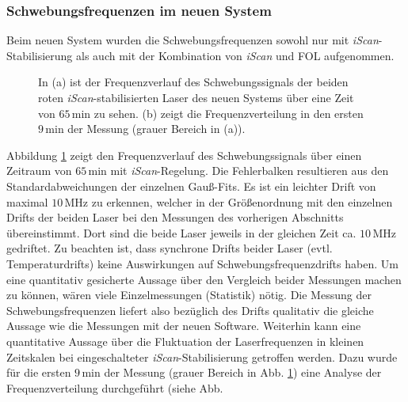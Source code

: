 \subsubsection{Schwebungsfrequenzen im neuen
System}\label{subsubsec:beatfrequenzmessung_neues_system}
Beim neuen System wurden die Schwebungsfrequenzen sowohl nur mit
\textit{iScan}-Stabilisierung als auch mit der Kombination von \textit{iScan}
und FOL aufgenommen.
\begin{figure}[hp]
 	\centering
 	\footnotesize
 	\fbox{\parbox{\dimexpr \linewidth - 2\fboxrule - 2\fboxsep}{
 	\subfloat[]{
		\label{subfig:beatfrequenzen_neu_iScan_drift}
		
		}\\
 	\subfloat[]{
		\label{subfig:beatfrequenzen_neu_iScan_histogramm}
		
		}
	}}
	\caption[Beatfrequenzen - neues System mit \textit{iScan}]{In (a) ist der
	Frequenzverlauf des Schwebungssignals der beiden roten
	\textit{iScan}-stabilisierten Laser des neuen Systems über eine Zeit von
	$65\,$min zu sehen.
	(b) zeigt die Frequenzverteilung in den ersten $9\,$min der Messung (grauer Bereich in (a)).}
	\label{fig:beatfrequenzen_neu_iScan}
\end{figure}
Abbildung
\ref{fig:beatfrequenzen_neu_iScan} zeigt den Frequenzverlauf des Schwebungssignals über einen Zeitraum von $65\,$min mit
\textit{iScan}-Regelung. Die Fehlerbalken resultieren aus den
Standardabweichungen der einzelnen Gauß-Fits. Es ist ein leichter Drift von
maximal $10\,$MHz zu erkennen, welcher in der Größenordnung mit den
einzelnen Drifts der beiden Laser bei den Messungen des vorherigen Abschnitts
übereinstimmt. Dort sind die beide Laser jeweils in der gleichen Zeit ca.
$10\,$MHz gedriftet. Zu beachten ist, dass synchrone Drifts beider Laser (evtl.
Temperaturdrifts) keine Auswirkungen auf Schwebungsfrequenzdrifts haben. Um eine
quantitativ gesicherte Aussage über den Vergleich beider Messungen machen zu
können, wären viele Einzelmessungen (Statistik) nötig. Die Messung der
Schwebungsfrequenzen liefert also bezüglich des Drifts qualitativ die gleiche Aussage wie die Messungen mit der
neuen Software. Weiterhin kann eine quantitative Aussage über die Fluktuation
der Laserfrequenzen in kleinen Zeitskalen bei eingeschalteter
\textit{iScan}-Stabilisierung getroffen werden. Dazu wurde für die ersten
$9\,$min der Messung (grauer Bereich in Abb.
\ref{fig:beatfrequenzen_neu_iScan})
eine Analyse der Frequenzverteilung durchgeführt (siehe Abb.
